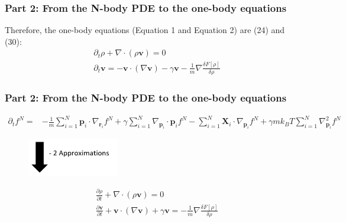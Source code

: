 \documentclass[aspectratio=169,xcolor=dvipsnames]{beamer}
\begin{document}
\begin{frame}
	\frametitle{Part 2: From the N-body PDE to the one-body equations}
	Therefore, the one-body equations (Equation 1 and Equation 2) are (24) and (30):
	\vspace{0.3 cm}
	\begin{align*}
	&{\partial_t \rho} + \nabla\cdot \left(\rho \mathbf{v}\right) = 0\\
	&\partial_t \mathbf{v} =  - \mathbf{v} \cdot\left(\nabla \mathbf{v}\right) - \gamma  \mathbf{v} - \frac{1}{m} { \nabla \frac{\delta F[\rho]}{\delta \rho}}
	\end{align*}
\end{frame}
\begin{frame}
	\frametitle{Part 2: From the N-body PDE to the one-body equations}
	\begin{align*}
	\partial_t f^N = &- \frac{1}{m} \sum_{i=1}^N \mathbf{p}_i \cdot \nabla_{\mathbf{r}_i} f^N + \gamma \sum_{i = 1}^N \nabla_{\mathbf{p}_i}
	\cdot \mathbf{p}_i f^N - \sum_{i=1}^N \mathbf{X}_i \cdot \nabla_{\mathbf{p}_i}f^N + \gamma m k_BT \sum_{i=1}^N \nabla^2_{\mathbf{p}_i}f^N	
	\end{align*}
	\vspace{-0.2cm}
	\begin{figure}
		\includegraphics[width=4cm]{Arrow3.png}
	\end{figure}
	\vspace{-0.3cm}
	\begin{align*}
	&\frac{\partial \rho}{\partial t} + \nabla \cdot \left(\rho \mathbf{v}\right) = 0 \\
	&\frac{\partial \mathbf{v}}{\partial t} + \mathbf{v} \cdot \left(\nabla \mathbf{v}\right) + \gamma \mathbf{v} = - \frac{1}{m} \nabla \frac{\delta {F}[\rho]}{\delta \rho}
	\end{align*}
\end{frame}
\end{document}

